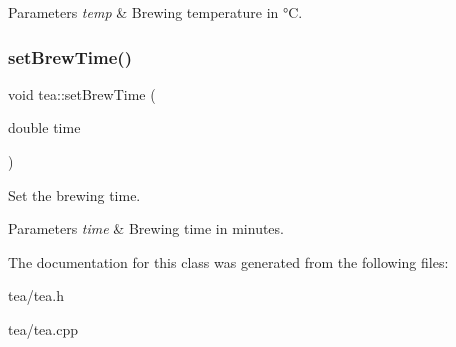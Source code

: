\begin{DoxyParams}{Parameters}
{\em temp} & Brewing temperature in °C. \\
\hline
\end{DoxyParams}
\mbox{\label{classtea_aa541720b90b31274c3bba3e77d765c81}} 
\subsubsection{\texorpdfstring{set\+Brew\+Time()}{setBrewTime()}}
{\footnotesize\ttfamily void tea\+::set\+Brew\+Time (\begin{DoxyParamCaption}\item[{double}]{time }\end{DoxyParamCaption})}



Set the brewing time. 


\begin{DoxyParams}{Parameters}
{\em time} & Brewing time in minutes. \\
\hline
\end{DoxyParams}


The documentation for this class was generated from the following files\+:\begin{DoxyCompactItemize}
\item 
tea/tea.\+h\item 
tea/tea.\+cpp\end{DoxyCompactItemize}
